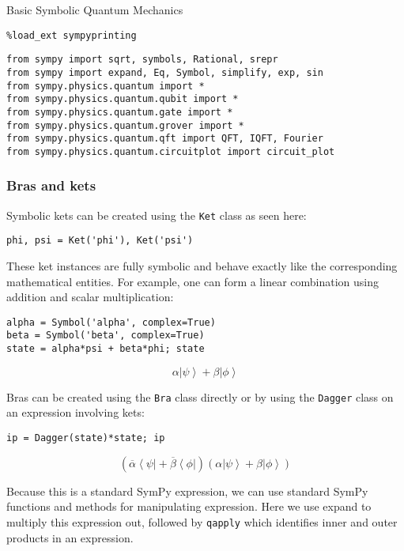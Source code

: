 Basic Symbolic Quantum Mechanics

\begin{verbatim}
%load_ext sympyprinting
\end{verbatim}

\begin{verbatim}
from sympy import sqrt, symbols, Rational, srepr
from sympy import expand, Eq, Symbol, simplify, exp, sin
from sympy.physics.quantum import *
from sympy.physics.quantum.qubit import *
from sympy.physics.quantum.gate import *
from sympy.physics.quantum.grover import *
from sympy.physics.quantum.qft import QFT, IQFT, Fourier
from sympy.physics.quantum.circuitplot import circuit_plot
\end{verbatim}

\subsubsection{Bras and kets}

Symbolic kets can be created using the \verb:Ket: class as seen here:

\begin{verbatim}
phi, psi = Ket('phi'), Ket('psi')
\end{verbatim}

These ket instances are fully symbolic and behave exactly like the corresponding
mathematical entities. For example, one can form a linear combination using
addition and scalar multiplication:

\begin{verbatim}
alpha = Symbol('alpha', complex=True)
beta = Symbol('beta', complex=True)
state = alpha*psi + beta*phi; state
\end{verbatim}
$$\alpha {\left|\psi\right\rangle } + \beta {\left|\phi\right\rangle }$$

Bras can be created using the \verb:Bra: class directly or by using the
\verb:Dagger: class on an expression involving kets:

\begin{verbatim}
ip = Dagger(state)*state; ip
\end{verbatim}
$$\left(\overline{\alpha} {\left\langle \psi\right|} + \overline{\beta} {\left\langle \phi\right|}\right) \left(\alpha {\left|\psi\right\rangle } + \beta {\left|\phi\right\rangle }\right)$$

Because this is a standard SymPy expression, we can use standard SymPy functions
and methods for manipulating expression. Here we use expand to multiply this
expression out, followed by \verb:qapply: which identifies inner and outer
products in an expression.

